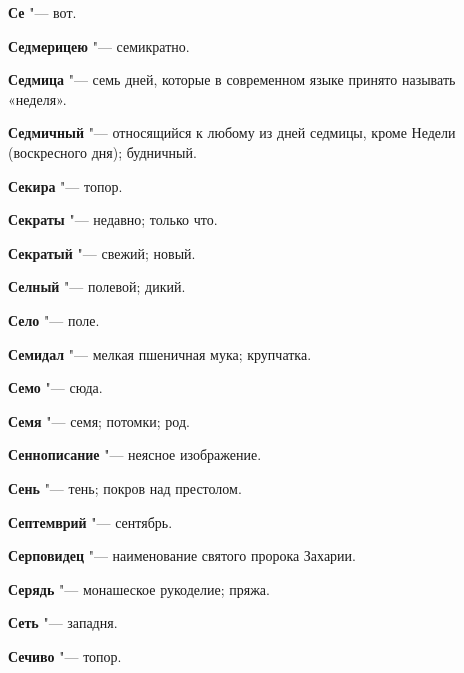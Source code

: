 \begin{mymulticols}{2}
\noindent\textbf{Се} "--- вот. 




\noindent\textbf{Седмерицею} "--- семикратно. 




\noindent\textbf{Седмица} "--- семь дней, которые в современном языке принято называть «неделя». 




\noindent\textbf{Седмичный} "--- относящийся к любому из дней седмицы, кроме Недели (воскресного дня); будничный. 




\noindent\textbf{Секира} "--- топор. 




\noindent\textbf{Секраты} "--- недавно; только что. 




\noindent\textbf{Секратый} "--- свежий; новый. 




\noindent\textbf{Селный} "--- полевой; дикий. 




\noindent\textbf{Село} "--- поле. 




\noindent\textbf{Семидал} "--- мелкая пшеничная мука; крупчатка. 




\noindent\textbf{Семо} "--- сюда. 




\noindent\textbf{Семя} "--- семя; потомки; род. 




\noindent\textbf{Сеннописание} "--- неясное изображение. 




\noindent\textbf{Сень} "--- тень; покров над престолом. 




\noindent\textbf{Септемврий} "--- сентябрь. 




\noindent\textbf{Серповидец} "--- наименование святого пророка Захарии. 




\noindent\textbf{Серядь} "--- монашеское рукоделие; пряжа. 




\noindent\textbf{Сеть} "--- западня. 




\noindent\textbf{Сечиво} "--- топор. 





\end{mymulticols}
